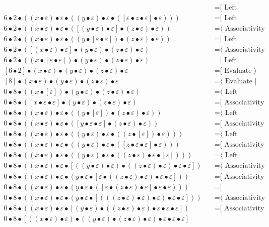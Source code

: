 \documentclass{article}
\begin{document}
\begin{align*}
  & \quad \text{=[ Left neutrality ⟩}\\
6 • 2 • ((x • ε) • ε • ((y • ε) • ε • ([ε • z • ε] • ε)))
  & \quad \text{=[ Left neutrality ⟩}\\
6 • 2 • ((x • ε) • ε • ([(y • ε) • ε] • (z • ε) • ε))
  & \quad \text{=⟨ Associativity ]}\\
6 • 2 • ((x • ε) • ε • ((y • [ε • ε]) • (z • ε) • ε))
  & \quad \text{=[ Left neutrality ⟩}\\
6 • 2 • ([(x • ε) • ε] • (y • ε) • (z • ε) • ε)
  & \quad \text{=⟨ Associativity ]}\\
6 • 2 • ((x • [ε • ε]) • (y • ε) • (z • ε) • ε)
  & \quad \text{=[ Left neutrality ⟩}\\
[6 • 2] • (x • ε) • (y • ε) • (z • ε) • ε
  & \quad \text{=[ Evaluate ⟩}\\
[8] • (x • ε) • (y • ε) • (z • ε) • ε
  & \quad \text{=⟨ Evaluate ]}\\
0 • 8 • ((x • [ε]) • (y • ε) • (z • ε) • ε)
  & \quad \text{=⟨ Left neutrality ]}\\
0 • 8 • ([x • ε • ε] • (y • ε) • (z • ε) • ε)
  & \quad \text{=[ Associativity ⟩}\\
0 • 8 • ((x • ε) • ε • ((y • [ε]) • (z • ε) • ε))
  & \quad \text{=⟨ Left neutrality ]}\\
0 • 8 • ((x • ε) • ε • ([y • ε • ε] • (z • ε) • ε))
  & \quad \text{=[ Associativity ⟩}\\
0 • 8 • ((x • ε) • ε • ((y • ε) • ε • ((z • [ε]) • ε)))
  & \quad \text{=⟨ Left neutrality ]}\\
0 • 8 • ((x • ε) • ε • ((y • ε) • ε • ([z • ε • ε] • ε)))
  & \quad \text{=[ Associativity ⟩}\\
0 • 8 • ((x • ε) • ε • ((y • ε) • ε • ((z • ε) • ε • [ε])))
  & \quad \text{=⟨ Left neutrality ]}\\
0 • 8 • ((x • ε) • ε • [((y • ε) • ε) • ((z • ε) • ε) • ε • ε])
  & \quad \text{=⟨ Associativity ]}\\
0 • 8 • ((x • ε) • ε • (y • ε • [ε • ((z • ε) • ε) • ε • ε]))
  & \quad \text{=[ Associativity ⟩}\\
0 • 8 • ((x • ε) • ε • (y • ε • ([ε • (z • ε) • ε] • ε • ε)))
  & \quad \text{=[ Commutativity ⟩}\\
0 • 8 • ((x • ε) • ε • (y • ε • [(((z • ε) • ε) • ε) • ε • ε]))
  & \quad \text{=⟨ Associativity ]}\\
0 • 8 • ((x • ε) • ε • [(y • ε) • ((z • ε) • ε) • ε • ε • ε])
  & \quad \text{=[ Associativity ⟩}\\
0 • 8 • [((x • ε) • ε) • ((y • ε) • (z • ε) • ε) • ε • ε • ε]

\end{align*}
\end{document}
